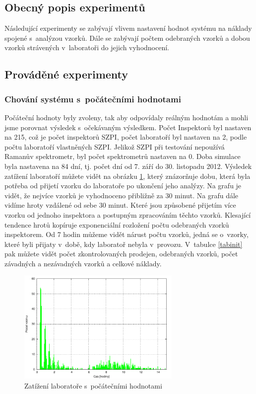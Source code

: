 \documentclass[11pt,a4paper]{article}
\begin{document}
\subsection{Obecný popis experimentů}
Následující experimenty se zabývají vlivem nastavení hodnot systému
na náklady spojené s~analýzou vzorků. Dále se zabývají počtem
odebraných vzorků a dobou vzorků strávených v~laboratoři do jejich
vyhodnocení.
\subsection{Prováděné experimenty}
\subsubsection*{Chování systému s~počátečními hodnotami}
Počáteční hodnoty byly zvoleny, tak aby odpovídaly reálným
hodnotám a mohli jsme porovnat výsledek s~očekávaným výsledkem.
Počet Inspektorů byl nastaven na 215, což je počet inspektorů
SZPI, počet laboratoří byl nastaven na 2, podle počtu laboratoří
vlastněných SZPI. Jelikož SZPI při testování nepoužívá Ramanův
spektrometr, byl počet spektrometrů nastaven na 0. Doba simulace
byla nastavena na 84 dní, tj. počet dní od 7. září do 30. listopadu 2012.
Výsledek zatížení laboratoří můžete vidět na obrázku \ref{init},
který znázorňuje dobu, která byla potřeba od přijetí vzorku do laboratoře po ukončení
jeho analýzy. Na grafu je vidět, že nejvíce vzorků je vyhodnoceno přibližně za 30 minut.
Na grafu dále vidíme hroty vzdálené od sebe 30 minut. Které jsou způsobené přijetím
více vzorku od jednoho inspektora a postupným zpracováním těchto vzorků. Klesající
tendence hrotů kopíruje exponenciální rozložení počtu odebraných vzorků inspektorem. Od 7 hodin můžeme
vidět nárust počtu vzorků, jedná se o~vzorky, které byli přijaty v~době, kdy
laboratoř nebyla v~provozu. V~tabulce \ref{tabinit} pak můžete vidět počet
zkontrolovaných prodejen, odebraných vzorků, počet závadných a nezávadných vzorků a 
celkové náklady. 

  \begin{figure}[h!]
    \centering
    \includegraphics[width=0.7\textwidth]{init}
    \caption{Zatížení laboratoře s~počátečními hodnotami}
    \label{init}
  \end{figure}
  
\end{document}
